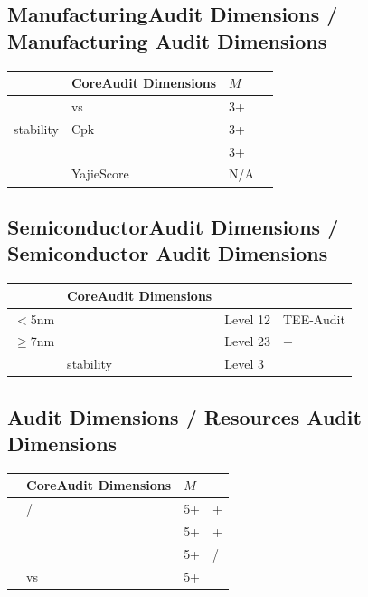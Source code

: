 \documentclass[12pt,a4paper]{article}
\theoremstyle{remark}
\begin{document}
\subsection{ManufacturingAudit Dimensions / Manufacturing Audit Dimensions}

\begin{table}[H]
\centering
\begin{tabular}{@{}p{2.5cm}p{5.5cm}p{1.5cm}p{2.5cm}@{}}
\toprule
\textbf{} & \textbf{CoreAudit Dimensions} & \textbf{$M$} & \textbf{} \\
\midrule
 &  vs  & 3+ &  \\
stability & Cpk & 3+ &  \\
 &  & 3+ &  \\
 & YajieScore & N/A &  \\
\bottomrule
\end{tabular}
\end{table}

\subsection{SemiconductorAudit Dimensions / Semiconductor Audit Dimensions}

\begin{table}[H]
\centering
\begin{tabular}{@{}p{2.5cm}p{3.5cm}p{2.5cm}p{4cm}@{}}
\toprule
\textbf{} & \textbf{CoreAudit Dimensions} & \textbf{} & \textbf{} \\
\midrule
$<$5nm &  & Level 12 & TEE-Audit \\
$\geq$7nm &  & Level 23 & + \\
 & stability & Level 3 &  \\
\bottomrule
\end{tabular}
\end{table}

\subsection{Audit Dimensions / Resources Audit Dimensions}

\begin{table}[H]
\centering
\begin{tabular}{@{}p{2.5cm}p{5.5cm}p{1.5cm}p{2.5cm}@{}}
\toprule
\textbf{} & \textbf{CoreAudit Dimensions} & \textbf{$M$} & \textbf{} \\
\midrule
 & / & 5+ & + \\
 &  & 5+ & + \\
 &  & 5+ & / \\
 &  vs  & 5+ &  \\
\bottomrule
\end{tabular}
\end{table}
\end{document}
